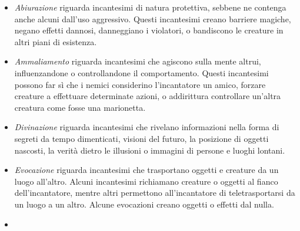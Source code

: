 \begin{multicols}{2}
\begin{itemize}
\item
\textit{Abiurazione} riguarda incantesimi di natura protettiva, sebbene ne contenga anche alcuni dall'uso aggressivo. Questi incantesimi creano barriere magiche, negano effetti dannosi, danneggiano i violatori, o bandiscono le creature in altri piani di esistenza.\\
\item
\textit{Ammaliamento} riguarda incantesimi che agiscono sulla mente altrui, influenzandone o controllandone il comportamento. Questi incantesimi possono far sì che i nemici considerino l'incantatore un amico, forzare creature a effettuare determinate azioni, o addirittura controllare un'altra creatura come fosse una marionetta.\\
\item
\textit{Divinazione} riguarda incantesimi che rivelano informazioni nella forma di segreti da tempo dimenticati, visioni del futuro, la posizione di oggetti nascosti, la verità dietro le illusioni o immagini di persone e luoghi lontani.\\
\item
\textit{Evocazione} riguarda incantesimi che trasportano oggetti e creature da un luogo all'altro. Alcuni incantesimi richiamano creature o oggetti al fianco dell'incantatore, mentre altri permettono all'incantatore di teletrasportarsi da un luogo a un altro. Alcune evocazioni creano oggetti o effetti dal nulla. \\
\item


\end{itemize}
\end{multicols}

